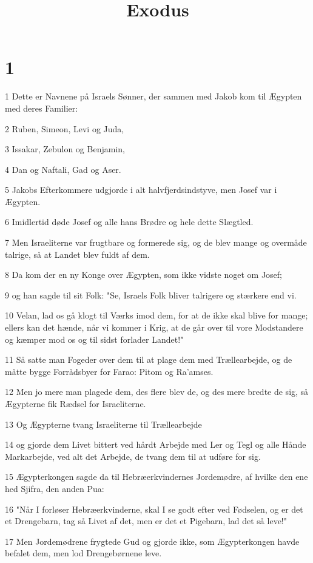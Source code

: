 

\title{Exodus}


\chapter{1}

\par 1 Dette er Navnene på Israels Sønner, der sammen med Jakob kom til Ægypten med deres Familier:
\par 2 Ruben, Simeon, Levi og Juda,
\par 3 Issakar, Zebulon og Benjamin,
\par 4 Dan og Naftali, Gad og Aser.
\par 5 Jakobs Efterkommere udgjorde i alt halvfjerdsindstyve, men Josef var i Ægypten.
\par 6 Imidlertid døde Josef og alle hans Brødre og hele dette Slægtled.
\par 7 Men Israeliterne var frugtbare og formerede sig, og de blev mange og overmåde talrige, så at Landet blev fuldt af dem.
\par 8 Da kom der en ny Konge over Ægypten, som ikke vidste noget om Josef;
\par 9 og han sagde til sit Folk: "Se, Israels Folk bliver talrigere og stærkere end vi.
\par 10 Velan, lad os gå klogt til Værks imod dem, for at de ikke skal blive for mange; ellers kan det hænde, når vi kommer i Krig, at de går over til vore Modstandere og kæmper mod os og til sidst forlader Landet!"
\par 11 Så satte man Fogeder over dem til at plage dem med Trællearbejde, og de måtte bygge Forrådsbyer for Farao: Pitom og Ra'amses.
\par 12 Men jo mere man plagede dem, des flere blev de, og des mere bredte de sig, så Ægypterne fik Rædsel for Israeliterne.
\par 13 Og Ægypterne tvang Israeliterne til Trællearbejde
\par 14 og gjorde dem Livet bittert ved hårdt Arbejde med Ler og Tegl og alle Hånde Markarbejde, ved alt det Arbejde, de tvang dem til at udføre for sig.
\par 15 Ægypterkongen sagde da til Hebræerkvindernes Jordemødre, af hvilke den ene hed Sjifra, den anden Pua:
\par 16 "Når I forløser Hebræerkvinderne, skal I se godt efter ved Fødselen, og er det et Drengebarn, tag så Livet af det, men er det et Pigebarn, lad det så leve!"
\par 17 Men Jordemødrene frygtede Gud og gjorde ikke, som Ægypterkongen havde befalet dem, men lod Drengebørnene leve.
